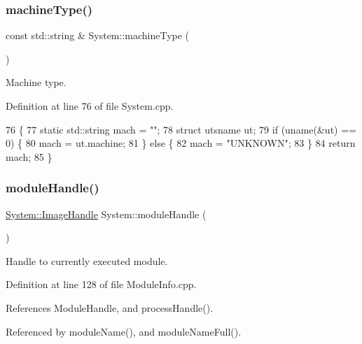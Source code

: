 \subsubsection{\texorpdfstring{machine\+Type()}{machineType()}}
{\footnotesize\ttfamily const std\+::string \& System\+::machine\+Type (\begin{DoxyParamCaption}{ }\end{DoxyParamCaption})}



Machine type. 



Definition at line 76 of file System.\+cpp.


\begin{DoxyCode}
76                                      \{
77   \textcolor{keyword}{static} std::string mach = \textcolor{stringliteral}{""};
78   \textcolor{keyword}{struct }utsname ut;
79   \textcolor{keywordflow}{if} (uname(&ut) == 0) \{
80     mach = ut.machine;
81   \} \textcolor{keywordflow}{else} \{
82     mach = \textcolor{stringliteral}{"UNKNOWN"};
83   \}
84   \textcolor{keywordflow}{return} mach;
85 \}
\end{DoxyCode}
\mbox{\label{namespaceSystem_ab88d0de1d6850b6f95522e9c242eeab0}} 
\subsubsection{\texorpdfstring{module\+Handle()}{moduleHandle()}}
{\footnotesize\ttfamily \hyperlink{namespaceSystem_a21dca3f6170a2b0a0ea3028040ba21b3}{System\+::\+Image\+Handle} System\+::module\+Handle (\begin{DoxyParamCaption}{ }\end{DoxyParamCaption})}



Handle to currently executed module. 



Definition at line 128 of file Module\+Info.\+cpp.



References Module\+Handle, and process\+Handle().



Referenced by module\+Name(), and module\+Name\+Full().



